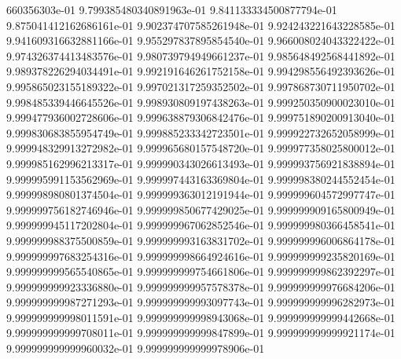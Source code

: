 660356303e-01	9.799385480340891963e-01	9.841133334500877794e-01	9.875041412162686161e-01	9.902374707585261948e-01	9.924243221643228585e-01	9.941609316632881166e-01	9.955297837895854540e-01	9.966008024043322422e-01	9.974326374413483576e-01	9.980739794949661237e-01	9.985648492568441892e-01	9.989378226294034491e-01	9.992191646261752158e-01	9.994298556492393626e-01	9.995865023155189322e-01	9.997021317259352502e-01	9.997868730711950702e-01	9.998485339446645526e-01	9.998930809197438263e-01	9.999250350900023010e-01	9.999477936002728606e-01	9.999638879306842476e-01	9.999751890200913040e-01	9.999830683855954749e-01	9.999885233342723501e-01	9.999922732652058999e-01	9.999948329913272982e-01	9.999965680157548720e-01	9.999977358025800012e-01	9.999985162996213317e-01	9.999990343026613493e-01	9.999993756921838894e-01	9.999995991153562969e-01	9.999997443163369804e-01	9.999998380244552454e-01	9.999998980801374504e-01	9.999999363012191944e-01	9.999999604572997747e-01	9.999999756182746946e-01	9.999999850677429025e-01	9.999999909165800949e-01	9.999999945117202804e-01	9.999999967062852546e-01	9.999999980366458541e-01	9.999999988375500859e-01	9.999999993163831702e-01	9.999999996006864178e-01	9.999999997683254316e-01	9.999999998664924616e-01	9.999999999235820169e-01	9.999999999565540865e-01	9.999999999754661806e-01	9.999999999862392297e-01	9.999999999923336880e-01	9.999999999957578378e-01	9.999999999976684206e-01	9.999999999987271293e-01	9.999999999993097743e-01	9.999999999996282973e-01	9.999999999998011591e-01	9.999999999998943068e-01	9.999999999999442668e-01	9.999999999999708011e-01	9.999999999999847899e-01	9.999999999999921174e-01	9.999999999999960032e-01	9.999999999999978906e-01
